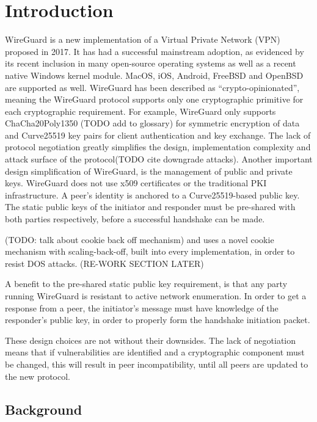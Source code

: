 \documentclass [11pt, proquest] {uwthesis}[2020/02/24]
\begin{document}
\chapter {Introduction}
WireGuard is a new implementation of a Virtual Private Network (VPN) proposed in 2017. It has had a successful mainstream adoption, as evidenced by its recent inclusion in many open-source operating systems\cite{donenfeld_wireguard_nodate} as well as a recent native Windows kernel module\cite{noauthor_wireguard-nt_nodate}. MacOS, iOS, Android, FreeBSD and OpenBSD are supported as well.
WireGuard has been described as “crypto-opinionated”, meaning the WireGuard protocol supports only one cryptographic primitive for each cryptographic requirement.
For example, WireGuard only supports ChaCha20Poly1350 (TODO add to glossary) for symmetric 
encryption\cite{donenfeld_wireguard_2017} of data and Curve25519 key pairs for client authentication and key exchange.
The lack of protocol negotiation greatly simplifies the design, implementation complexity and attack surface of the protocol(TODO cite downgrade attacks). Another important design simplification of WireGuard, is the management of public and private keys. WireGuard does not use x509 certificates or the traditional PKI infrastructure. A peer's identity is anchored to a Curve25519-based public key. 
The static public keys of the initiator and responder must be pre-shared with both parties respectively, before a successful handshake can be made. 

(TODO: talk about cookie back off mechanism) and uses a novel cookie mechanism with scaling-back-off, built into every implementation, in order to resist DOS attacks. (RE-WORK SECTION LATER)

A benefit to the pre-shared static public key requirement, is that any party running WireGuard is resistant to active network enumeration. In order to get a response from a peer, the initiator's message must have knowledge of the responder's public key, in order to properly form the handshake initiation packet. 

These design choices are not without their downsides. The lack of negotiation means that if vulnerabilities are identified and a cryptographic component must be changed, this will result in peer incompatibility, until all peers are updated to the new protocol.



\section {Background}
\end{document}
